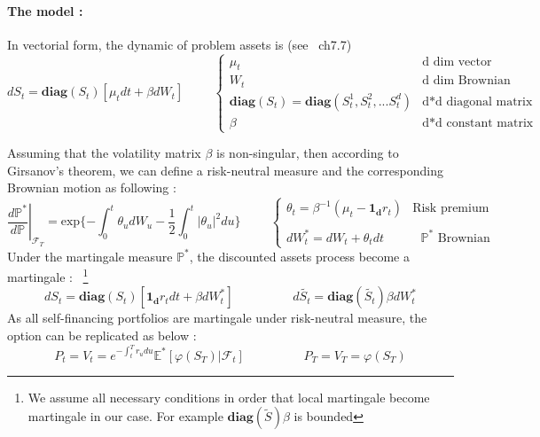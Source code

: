 \documentclass[a4paper,10pt]{article}
\begin{document}
\paragraph{The model :}In vectorial form, the dynamic of problem assets is (see~\cite{mathfiElliot} ch7.7)
\[
dS_t = \textbf{diag}(S_t) [\mu_t dt  +  \beta dW_t]
\hspace{1cm}
\left\{
\begin{array}{ll}
\mu_t                                        & \text{d dim vector}   \\
W_t                                          & \text{d dim Brownian}        \\
\textbf{diag}(S_t) = \textbf{diag}(S^1_t, S^2_t, ... S^d_t)  & \text{d*d diagonal matrix}      \\
\beta                                        & \text{d*d constant matrix}      
\end{array}\right.
\]

Assuming that the volatility matrix $\beta$ is non-singular, then according to Girsanov's theorem, we can define a risk-neutral measure and the corresponding Brownian motion as following : 
\[
\left. \frac{d \mathbb{P}^* }{d\mathbb{P}}\right|_{\mathcal{F}_T} 
= \text{exp}\{ - \int_0^t \theta_u dW_u - \frac{1}{2} \int_0^t |\theta_u|^2 du \}
\hspace{1cm}
\left\{
\begin{array}{ll}
\theta_t = \beta^{-1}(\mu_t - \mathbf{1_d} r_t)   & \text{Risk premium}   \\ \\
dW_t^* = dW_t + \theta_t dt                          & \text{ $\mathbb{P}^*$ Brownian }       
\end{array}
\right.
\]
Under the martingale measure $\mathbb{P}^*$, the discounted assets process become a martingale : ~\footnote{We assume all necessary conditions in order that local martingale become martingale in our case. For example $\textbf{diag}(\widetilde{S}) \beta$ is bounded}
\[
d S_t = \textbf{diag}(S_t) [ \mathbf{1_d} r_t dt  + \beta dW_t^*]
\hspace{2cm}
d \widetilde{S_t} = \textbf{diag}(\widetilde{S_t}) \beta dW_t^*
\]
As all self-financing portfolios are martingale under risk-neutral measure, the option can be replicated as below : 
\[
P_t = V_t = e^{ -\int_t^T r_u du } \mathbb{E}^* [\varphi(S_T) | \mathcal{F}_t]
\hspace{2cm}
P_T = V_T = \varphi(S_T)
\]
\end{document}
